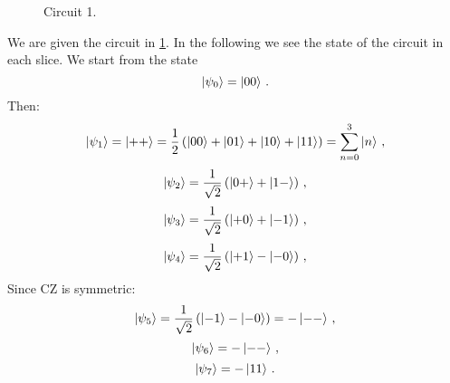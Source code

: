 \begin{figure}[h]

    \centering

    \caption{Circuit 1.}
        \label{fig:circuit_1}
\end{figure}
We are given the circuit in \cref{fig:circuit_1}. In the following we see the state of 
the circuit in each slice.
We start from the state
\begin{equation}
    \ket{\psi_0} = \ket{00}  \, .
\end{equation}
Then:
\begin{equation}
        \ket{\psi_1} = \ket{++} = \frac{1}{2} \left( \ket{00} + \ket{01} + \ket{10} + \ket{11} \right) = \sum_{n=0}^{3} \ket{n} \, ,
\end{equation}
\begin{equation}
        \ket{\psi_2} = \frac{1}{\sqrt{2}} \left( \ket{0+} + \ket{1-}\right) \, ,
\end{equation}
\begin{equation}
        \ket{\psi_3} = \frac{1}{\sqrt{2}} \left( \ket{+0} + \ket{-1} \right) \, ,
\end{equation}
\begin{equation}
        \ket{\psi_4} = \frac{1}{\sqrt{2}} \left( \ket{+1} - \ket{-0} \right)  \, ,
\end{equation}
Since CZ is symmetric:
\begin{equation}
        \ket{\psi_5} =  \frac{1}{\sqrt{2}} \left( \ket{-1} - \ket{-0} \right) =  - \ket{--} \, ,
\end{equation}
\begin{equation}
        \ket{\psi_6} = - \ket{--} \, ,
\end{equation}
\begin{equation}
        \ket{\psi_7} = - \ket{11} \, .
\end{equation}

